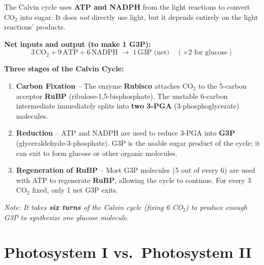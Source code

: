 \documentclass[11pt, letterpaper]{article}
\begin{document}
The Calvin cycle uses \textbf{ATP and NADPH} from the light reactions to convert CO$_2$ into sugar. It does \emph{not} directly use light, but it depends entirely on the light reactions' products.

\textbf{Net inputs and output (to make 1 G3P):}
\[
  3\,\text{CO}_2 + 9\,\text{ATP} + 6\,\text{NADPH} \;\longrightarrow\; 1\,\text{G3P (net)} \quad (\times 2 \text{ for glucose})
\]

\begin{tcolorbox}[colback=part2bg, colframe=sectiongreen, arc=3pt, boxrule=1pt]
\textbf{Three stages of the Calvin Cycle:}
\begin{enumerate}[noitemsep, leftmargin=*]
  \item \textbf{Carbon Fixation} -- The enzyme \textbf{Rubisco} attaches CO$_2$ to the 5-carbon acceptor \textbf{RuBP} (ribulose-1,5-bisphosphate). The unstable 6-carbon intermediate immediately splits into \textbf{two 3-PGA} (3-phosphoglycerate) molecules.
  \item \textbf{Reduction} -- ATP and NADPH are used to reduce 3-PGA into \textbf{G3P} (glyceraldehyde-3-phosphate). G3P is the usable sugar product of the cycle; it can exit to form glucose or other organic molecules.
  \item \textbf{Regeneration of RuBP} -- Most G3P molecules (5 out of every 6) are used with ATP to regenerate \textbf{RuBP}, allowing the cycle to continue. For every 3 CO$_2$ fixed, only 1 net G3P exits.
\end{enumerate}
\end{tcolorbox}

\vspace{4pt}
\textit{Note: It takes \textbf{six turns} of the Calvin cycle (fixing 6 CO$_2$) to produce enough G3P to synthesize one glucose molecule.}

\section*{Photosystem I vs.\ Photosystem II}
\end{document}
